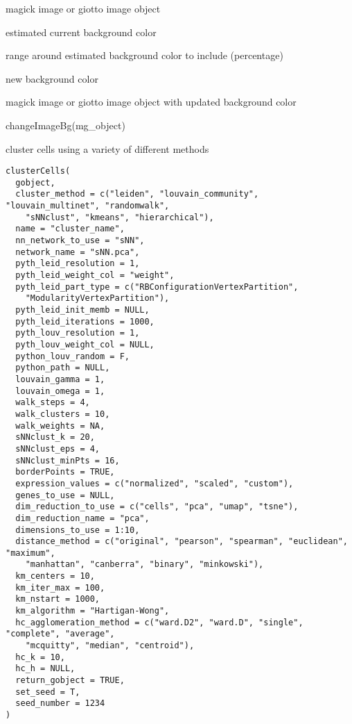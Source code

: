 \documentclass[a4paper]{book}
\begin{document}
%
\begin{Arguments}
\begin{ldescription}
\item[\code{mg\_object}] magick image or giotto image object

\item[\code{bg\_color}] estimated current background color

\item[\code{perc\_range}] range around estimated background color to include (percentage)

\item[\code{new\_color}] new background color
\end{ldescription}
\end{Arguments}
%
\begin{Value}
magick image or giotto image object with updated background color
\end{Value}
%
\begin{Examples}
\begin{ExampleCode}
    changeImageBg(mg_object)
\end{ExampleCode}
\end{Examples}
%
\begin{Description}\relax
cluster cells using a variety of different methods
\end{Description}
%
\begin{Usage}
\begin{verbatim}
clusterCells(
  gobject,
  cluster_method = c("leiden", "louvain_community", "louvain_multinet", "randomwalk",
    "sNNclust", "kmeans", "hierarchical"),
  name = "cluster_name",
  nn_network_to_use = "sNN",
  network_name = "sNN.pca",
  pyth_leid_resolution = 1,
  pyth_leid_weight_col = "weight",
  pyth_leid_part_type = c("RBConfigurationVertexPartition",
    "ModularityVertexPartition"),
  pyth_leid_init_memb = NULL,
  pyth_leid_iterations = 1000,
  pyth_louv_resolution = 1,
  pyth_louv_weight_col = NULL,
  python_louv_random = F,
  python_path = NULL,
  louvain_gamma = 1,
  louvain_omega = 1,
  walk_steps = 4,
  walk_clusters = 10,
  walk_weights = NA,
  sNNclust_k = 20,
  sNNclust_eps = 4,
  sNNclust_minPts = 16,
  borderPoints = TRUE,
  expression_values = c("normalized", "scaled", "custom"),
  genes_to_use = NULL,
  dim_reduction_to_use = c("cells", "pca", "umap", "tsne"),
  dim_reduction_name = "pca",
  dimensions_to_use = 1:10,
  distance_method = c("original", "pearson", "spearman", "euclidean", "maximum",
    "manhattan", "canberra", "binary", "minkowski"),
  km_centers = 10,
  km_iter_max = 100,
  km_nstart = 1000,
  km_algorithm = "Hartigan-Wong",
  hc_agglomeration_method = c("ward.D2", "ward.D", "single", "complete", "average",
    "mcquitty", "median", "centroid"),
  hc_k = 10,
  hc_h = NULL,
  return_gobject = TRUE,
  set_seed = T,
  seed_number = 1234
)
\end{verbatim}
\end{Usage}
\end{document}
